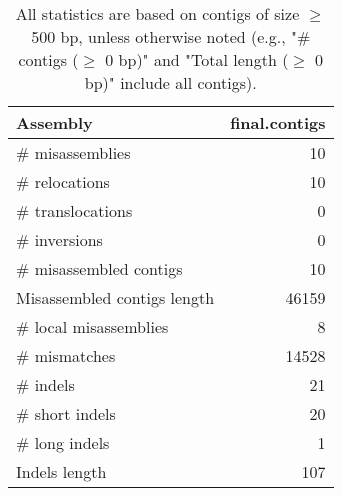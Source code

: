 \documentclass[12pt,a4paper]{article}
\begin{document}
\begin{table}[ht]
\begin{center}
\caption{All statistics are based on contigs of size $\geq$ 500 bp, unless otherwise noted (e.g., "\# contigs ($\geq$ 0 bp)" and "Total length ($\geq$ 0 bp)" include all contigs).}
\begin{tabular}{|l*{1}{|r}|}
\hline
Assembly & final.contigs \\ \hline
\# misassemblies & 10 \\ \hline
\hspace{5mm}\# relocations & 10 \\ \hline
\hspace{5mm}\# translocations & 0 \\ \hline
\hspace{5mm}\# inversions & 0 \\ \hline
\# misassembled contigs & 10 \\ \hline
Misassembled contigs length & 46159 \\ \hline
\# local misassemblies & 8 \\ \hline
\# mismatches & 14528 \\ \hline
\# indels & 21 \\ \hline
\hspace{5mm}\# short indels & 20 \\ \hline
\hspace{5mm}\# long indels & 1 \\ \hline
Indels length & 107 \\ \hline
\end{tabular}
\end{center}
\end{table}
\end{document}
